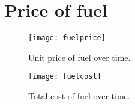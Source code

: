 \documentclass[12pt, a4paper]{article}
\begin{document}
\section{Price of fuel}
\label{s:cost}

\begin{figure} [htbp]
\centering
\texttt{[image: fuelprice]}
\caption{Unit price of fuel over time.}
\label{f:unit}
\end{figure}

\begin{figure} [htbp]
\centering
\texttt{[image: fuelcost]}
\caption{Total cost of fuel over time.}
\label{f:cost}
\end{figure}

 

%
%
%
\end{document}
